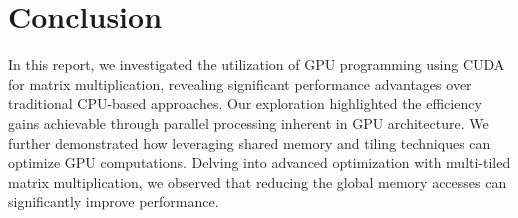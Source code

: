 \documentclass{article}
\begin{document}
\section{Conclusion}
In this report, we investigated the utilization of GPU programming using CUDA for matrix multiplication, 
revealing significant performance advantages over traditional CPU-based approaches. 
Our exploration highlighted the efficiency gains achievable through parallel processing inherent in GPU architecture. 
We further demonstrated how leveraging shared memory and tiling techniques can optimize GPU computations. 
Delving into advanced optimization with multi-tiled matrix multiplication, we observed 
that reducing the global memory accesses can significantly improve performance.
\end{document}
